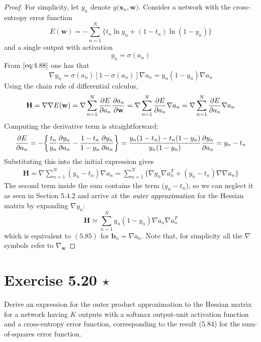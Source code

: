 \begin{proof}
    For simplicity, let $y_n$ denote $y(\mathbf{x}_n, \mathbf{w)}$.
    Consider a network with the cross-entropy error function
    \begin{equation}\label{eq:5.21}\tag{5.21}
        E(\mathbf{w}) = -\sum_{n=1}^{N} \{t_n \ln y_n + (1 - t_n) \ln(1 - y_n)\}
    \end{equation}
    and a single output with activation
    \[
        y_n = \sigma(a_n)
    \] 
    From $\eqref{eq:4.88}$ one has that
    \[
        \nabla y_n
        = \sigma(a_n)[1 - \sigma(a_n)]\nabla a_n
        = y_n(1 - y_n) \nabla a_n
    \] 
    Using the chain rule of differential calculus,
    \begin{align*}
        \mathbf{H} 
        = \nabla \nabla E(\mathbf{w})
        = \nabla \sum_{n=1}^{N} \pdv{E}{a_n} \pdv{a_n}{\mathbf{w}}
        = \nabla \sum_{n=1}^{N} \pdv{E}{a_n} \nabla a_n
        = \nabla \sum_{n=1}^{N} \pdv{E}{a_n} \nabla a_n
    \end{align*}
    Computing the derivative term is straightforward:
    \[
        \pdv{E}{a_n} 
        = -\bigg\{\frac{t_n}{y_n} \pdv{y_n}{a_n}
        -\frac{1 - t_n}{1 - y_n} \pdv{y_n}{a_n} \bigg\}
        = \frac{y_n(1 - t_n) - t_n(1 - y_n)}{y_n(1 - y_n)} 
        \pdv{y_n}{a_n}
        = y_n - t_n
    \] 
    Substituting this into the initial expression gives
    \begin{align*}
        \mathbf{H} 
        = \nabla  \sum_{n=1}^{N} (y_n - t_n) \nabla a_n
        = \sum_{n=1}^{N} \big\{\nabla y_n \nabla a_n^T + 
        (y_n - t_n) \nabla \nabla a_n\big\}
    \end{align*}
    The second term inside the sum contains the term ($y_n - t_n$), so
    we can neglect it as seen in Section 5.4.2 and arrive at the $\emph{outer 
    approximation}$ for the Hessian matrix by expanding $\nabla y_n$:
    \[
    \mathbf{H} \simeq \sum_{n=1}^{N} y_n(1 - y_n) \nabla a_n \nabla a_n^T
    \] 
    which is equivalent to $(5.85)$ for $\mathbf{b}_n = \nabla a_n$.
    Note that, for simplicity all the $\nabla$ symbols refer to $\nabla_\mathbf{w}$ 
\end{proof}

\section*{Exercise 5.20 $\star$}
Derive an expression for the outer product approximation
to the Hessian matrix for a network having $K$ outputs with a softmax
output-unit activation function and a cross-entropy error function,
corresponding to the result (5.84) for the sum-of-squares error
function.


